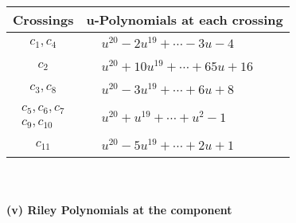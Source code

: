 \documentclass[1p]{elsarticle_modified}
\theoremstyle{definition}
\begin{document}
\begin{tabular}{m{50pt}|m{274pt}}
Crossings & \hspace{64pt}u-Polynomials at each crossing \\
\hline $$\begin{aligned}c_{1},c_{4}\end{aligned}$$&$\begin{aligned}
&u^{20}-2 u^{19}+\cdots-3 u-4
\end{aligned}$\\
\hline $$\begin{aligned}c_{2}\end{aligned}$$&$\begin{aligned}
&u^{20}+10 u^{19}+\cdots+65 u+16
\end{aligned}$\\
\hline $$\begin{aligned}c_{3},c_{8}\end{aligned}$$&$\begin{aligned}
&u^{20}-3 u^{19}+\cdots+6 u+8
\end{aligned}$\\
\hline $$\begin{aligned}c_{5},c_{6},c_{7}\\c_{9},c_{10}\end{aligned}$$&$\begin{aligned}
&u^{20}+u^{19}+\cdots+u^2-1
\end{aligned}$\\
\hline $$\begin{aligned}c_{11}\end{aligned}$$&$\begin{aligned}
&u^{20}-5 u^{19}+\cdots+2 u+1
\end{aligned}$\\
\hline
\end{tabular}\\~\\
\newpage\renewcommand{\arraystretch}{1}
\flushleft \textbf{(v) Riley Polynomials at the component}\newline \\
\end{document}
